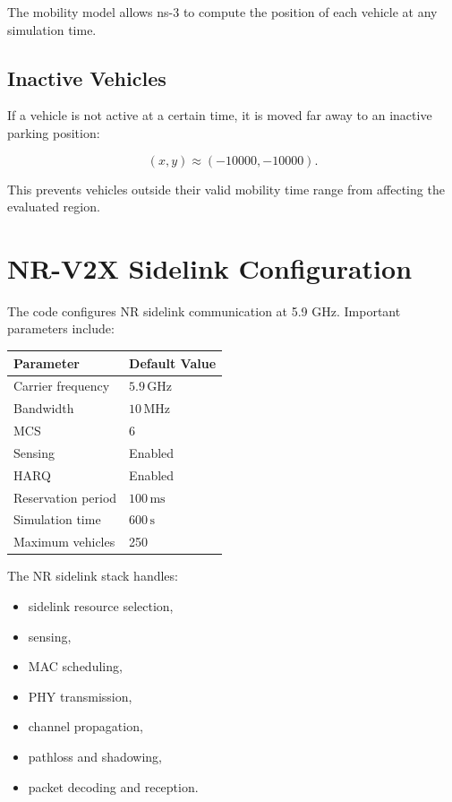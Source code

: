 \documentclass[11pt,a4paper]{article}
\begin{document}
The mobility model allows ns-3 to compute the position of each vehicle at any simulation time.

\subsection{Inactive Vehicles}

If a vehicle is not active at a certain time, it is moved far away to an inactive parking position:

\begin{equation}
(x,y) \approx (-10000, -10000).
\end{equation}

This prevents vehicles outside their valid mobility time range from affecting the evaluated region.

\section{NR-V2X Sidelink Configuration}

The code configures NR sidelink communication at 5.9 GHz. Important parameters include:

\begin{center}
\begin{tabular}{ll}
\toprule
Parameter & Default Value \\
\midrule
Carrier frequency & \(5.9\,\mathrm{GHz}\) \\
Bandwidth & \(10\,\mathrm{MHz}\) \\
MCS & 6 \\
Sensing & Enabled \\
HARQ & Enabled \\
Reservation period & \(100\,\mathrm{ms}\) \\
Simulation time & \(600\,\mathrm{s}\) \\
Maximum vehicles & 250 \\
\bottomrule
\end{tabular}
\end{center}

The NR sidelink stack handles:
\begin{itemize}
    \item sidelink resource selection,
    \item sensing,
    \item MAC scheduling,
    \item PHY transmission,
    \item channel propagation,
    \item pathloss and shadowing,
    \item packet decoding and reception.
\end{itemize}
\end{document}
